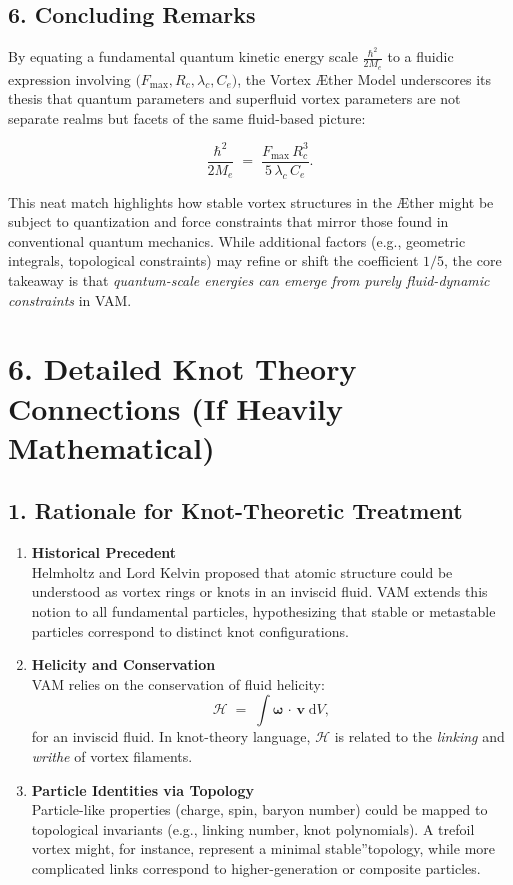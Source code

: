 \documentclass[a4paper,12pt]{article}
\begin{document}
\subsection*{6. Concluding Remarks}

By equating a fundamental quantum kinetic energy scale \(\tfrac{\hbar^2}{2M_e}\) to a fluidic expression involving \(\bigl(F_{\max}, R_c, \lambda_c, C_e\bigr)\), the Vortex Æther Model underscores its thesis that quantum parameters and superfluid vortex parameters are not separate realms but facets of the same fluid-based picture:

\[
    \boxed{
        \frac{\hbar^2}{2 M_e}
        \;=\;
        \frac{F_{\max} \, R_c^3}{5 \,\lambda_c\,C_e}.
    }
\]

This neat match highlights how stable vortex structures in the Æther might be subject to quantization and force constraints that mirror those found in conventional quantum mechanics. While additional factors (e.g., geometric integrals, topological constraints) may refine or shift the coefficient \(1/5\), the core takeaway is that \textit{quantum-scale energies can emerge from purely fluid-dynamic constraints} in VAM.
\label{appendix:5}


\section*{6. Detailed Knot Theory Connections (If Heavily Mathematical)}

\subsection*{1. Rationale for Knot-Theoretic Treatment}

\begin{enumerate}
    \item \textbf{Historical Precedent} \\
    Helmholtz and Lord Kelvin proposed that atomic structure could be understood as vortex rings or knots in an inviscid fluid. VAM extends this notion to all fundamental particles, hypothesizing that stable or metastable particles correspond to distinct knot configurations.
    \item \textbf{Helicity and Conservation} \\
    VAM relies on the conservation of fluid helicity:
    \[
        \mathcal{H}
        \;=\;
        \int
        \boldsymbol{\omega}\,\cdot\,\mathbf{v}\;\mathrm{d}V,
    \]
    for an inviscid fluid. In knot-theory language, \(\mathcal{H}\) is related to the \textit{linking} and \textit{writhe} of vortex filaments.
    \item \textbf{Particle Identities via Topology} \\
    Particle-like properties (charge, spin, baryon number) could be mapped to topological invariants (e.g., linking number, knot polynomials). A trefoil vortex might, for instance, represent a minimal \grqq stable\textquotedblright topology, while more complicated links correspond to higher-generation or composite particles.
\end{enumerate}
\end{document}
